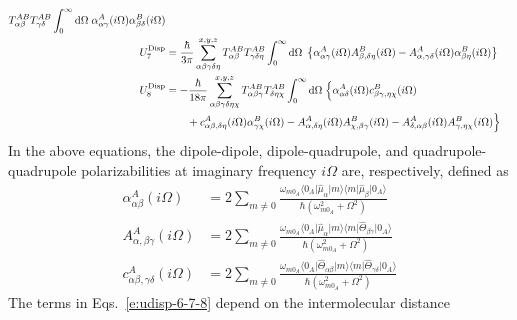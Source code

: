 \documentclass[a4paper,titlepage,twoside,fleqn,12pt]{book}
\begin{document}
\begin{refsection}
\begin{subequations}
\begin{align}
   T^{AB}_{\alpha\beta}T^{AB}_{\gamma\delta} \int_0^{\infty} {\rm d}\Omega \; 
    \alpha^A_{\alpha\gamma}(i\Omega)\alpha^B_{\beta\delta}(i\Omega) \\
  U^{\rm Disp}_7 &= \frac{\hbar}{3\pi} \sum_{\alpha\beta\gamma\delta\eta}^{x,y,z}
   T^{AB}_{\alpha\beta}T^{AB}_{\gamma\delta\eta} \int_0^{\infty} {\rm d}\Omega \; 
    \left\{ 
     \alpha^A_{\alpha\gamma}(i\Omega)A^B_{\beta,\delta\eta}(i\Omega) -
     A^A_{\alpha,\gamma\delta}(i\Omega)\alpha^B_{\beta\eta}(i\Omega) 
    \right\} \\
   U^{\rm Disp}_8 &= - \frac{\hbar}{18\pi} \sum_{\alpha\beta\gamma\delta\eta\chi}^{x,y,z}
   T^{AB}_{\alpha\beta\gamma}T^{AB}_{\delta\eta\chi} \int_0^{\infty} {\rm d}\Omega \; 
    \Big\{ 
      \alpha^A_{\alpha\delta}(i\Omega) c^B_{\beta\gamma,\eta\chi}(i\Omega) \nonumber \\  &\qquad+ 
      c^A_{\alpha\beta,\delta\eta}(i\Omega) \alpha^B_{\gamma\chi}(i\Omega) -
      A^A_{\alpha,\delta\eta}(i\Omega) A^B_{\chi,\beta\gamma}(i\Omega) -
      A^A_{\delta,\alpha\beta}(i\Omega) A^B_{\gamma,\eta\chi}(i\Omega)
   \Big\}
 \end{align}
\end{subequations}
%
In the above equations, the dipole\hyp{}dipole, dipole\hyp{}quadrupole, 
and quadrupole\hyp{}quadrupole polarizabilities at imaginary frequency 
$i\Omega$ are, respectively, defined as
%
\begin{subequations} \label{e:iomega-polarizabilities}
 \begin{align}
  \alpha^A_{\alpha\beta}(i\Omega) &= 2\sum_{m\neq 0} \frac{
\omega_{m0_A} 
\langle 0_A \lvert \hat{\mu}_{\alpha} \rvert m \rangle  \langle m \lvert \hat{\mu}_{\beta} \rvert 0_A \rangle 
}{\hbar \left( \omega_{m0_A}^2 + \Omega^2 \right)} \\
%
  A^A_{\alpha,\beta\gamma}(i\Omega) &= 2\sum_{m\neq 0} \frac{
\omega_{m0_A} 
\langle 0_A \lvert \hat{\mu}_{\alpha} \rvert m \rangle  \langle m \lvert \hat{\Theta}_{\beta\gamma} \rvert 0_A \rangle 
}{\hbar \left( \omega_{m0_A}^2 + \Omega^2 \right)} \\
%
  c^A_{\alpha\beta,\gamma\delta}(i\Omega) &= 2\sum_{m\neq 0} \frac{
\omega_{m0_A} 
\langle 0_A \lvert \hat{\Theta}_{\alpha\beta} \rvert m \rangle  \langle m \lvert \hat{\Theta}_{\gamma\delta} \rvert 0_A \rangle 
}{\hbar \left( \omega_{m0_A}^2 + \Omega^2 \right)}
 \end{align}
\end{subequations}
%
The terms in Eqs.~\eqref{e:udisp-6-7-8} depend on the intermolecular distance 

\end{refsection}
\end{document}

